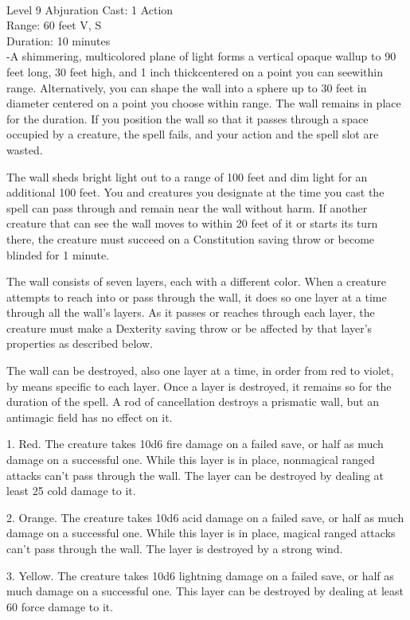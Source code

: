 \documentclass[10pt,twocolumn]{report}
\begin{document}
 \\
Level 9 \quad Abjuration \quad Cast: 1 Action\\
Range: 60 feet \quad V, S\\
Duration: 10 minutes \quad \\
-A shimmering, multicolored plane of light forms a vertical opaque wallup to 90 feet long, 30 feet high, and 1 inch thickcentered on a point you can seewithin range. Alternatively, you can shape the wall into a sphere up to 30 feet in diameter centered on a point you choose within range. The wall remains in place for the duration. If you position the wall so that it passes through a space occupied by a creature, the spell fails, and your action and the spell slot are wasted.

The wall sheds bright light out to a range of 100 feet and dim light for an additional 100 feet. You and creatures you designate at the time you cast the spell can pass through and remain near the wall without harm. If another creature that can see the wall moves to within 20 feet of it or starts its turn there, the creature must succeed on a Constitution saving throw or become blinded for 1 minute.

The wall consists of seven layers, each with a different color. When a creature attempts to reach into or pass through the wall, it does so one layer at a time through all the wall’s layers. As it passes or reaches through each layer, the creature must make a Dexterity saving throw or be affected by that layer’s properties as described below.

The wall can be destroyed, also one layer at a time, in order from red to violet, by means specific to each layer. Once a layer is destroyed, it remains so for the duration of the spell. A rod of cancellation destroys a prismatic wall, but an antimagic field has no effect on it.

1. Red. The creature takes 10d6 fire damage on a failed save, or half as much damage on a successful one. While this layer is in place, nonmagical ranged attacks can’t pass through the wall. The layer can be destroyed by dealing at least 25 cold damage to it.

2. Orange. The creature takes 10d6 acid damage on a failed save, or half as much damage on a successful one. While this layer is in place, magical ranged attacks can’t pass through the wall. The layer is destroyed by a strong wind.

3. Yellow. The creature takes 10d6 lightning damage on a failed save, or half as much damage on a successful one. This layer can be destroyed by dealing at least 60 force damage to it.
\end{document}
